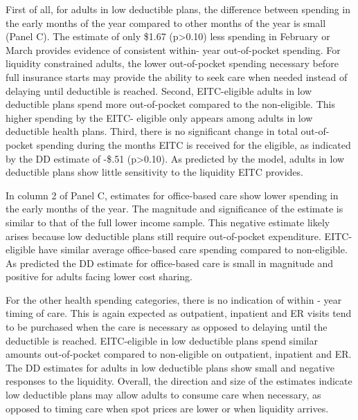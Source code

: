 \documentclass[smallcondensed,referee]{svjour3}
\begin{document}
First of all, for adults in low deductible plans, the difference between spending in the early months of the year compared to other months of the year is small (Panel C). The estimate of only \$1.67 (p>0.10) less spending in February or March provides evidence of consistent within- year out-of-pocket spending. For liquidity constrained adults, the lower out-of-pocket spending necessary before full insurance starts may provide the ability to seek care when needed instead of delaying until deductible is reached.
Second, EITC-eligible adults in low deductible plans spend more out-of-pocket compared to the non-eligible. This higher spending by the EITC- eligible only appears among adults in low deductible health plans.  Third, there is no significant change in total out-of-pocket spending during the months EITC is received for the eligible, as indicated by the DD estimate of -\$.51 (p>0.10). As predicted by the \cite{gross_liquidity_2020} model, adults in low deductible plans show little sensitivity to the liquidity EITC provides.
 
In column 2 of Panel C, estimates for office-based care show lower spending in the early months of the year. The magnitude and significance of the estimate is similar to that of the full lower income sample. This negative estimate likely arises because low deductible plans still require out-of-pocket expenditure. EITC-eligible have similar average office-based care spending compared to non-eligible. As predicted the DD estimate for office-based care is small in magnitude and positive for adults facing lower cost sharing. 
 
 For the other health spending categories, there is no indication of within - year timing of care. This is again expected as outpatient, inpatient and ER visits tend to be purchased when the care is necessary as opposed to delaying until the deductible is reached. EITC-eligible in low deductible plans spend similar amounts out-of-pocket compared to non-eligible on outpatient, inpatient and ER. The DD estimates for adults in low deductible plans show small and negative responses to the liquidity. 
 Overall, the direction and size of the estimates indicate low deductible plans may allow adults to consume care when necessary, as opposed to timing care when spot prices are lower or when liquidity arrives. 
\end{document}
